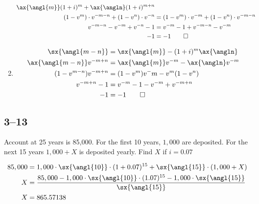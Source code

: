\documentclass[a4paper, 12pt, reqno]{amsart}
\numberwithin{equation}{section}
\begin{document}
\begin{enumerate}[label=(\alph*)]
\begin{equation}
\begin{aligned}
                    \ax{\angl{m}}(1+i)^m + \ax{\angln}(1+i)^{m+n}       \\
                (1 - v^m) \cdot v^{-m-n} + (1-v^n) \cdot v^{-n} &= 
                    (1-v^m) \cdot v^{-m} + (1-v^n) \cdot v^{-m-n}       \\
                v^{-m-n}-v^{-m}+v^{-n}-1 &= v^{-m} - 1 + v^{-m-n}-v^{-m}\\
                -1 &= -1    \qed
            \end{aligned}
        \end{equation}
    \item 
        \begin{equation}\nonumber
            \begin{aligned}
                \sx{\angl{m-n}} &= \sx{\angl{m}} - (1+i)^m\ax{\angln}   \\
                \ax{\angl{m-n}}v^{-m+n} &= \ax{\angl{m}}v^{-m}
                    - \ax{\angln}v^{-m}                                 \\
                (1-v^{m-n})v^{-m+n} &= (1-v^m)v^-m - v^m (1-v^n)        \\
                v^{-m+n} - 1 &= v^{-m} - 1 - v^{-m} + v^{-m+n}          \\
                -1 &= -1 \qed
            \end{aligned}
        \end{equation}
\end{enumerate}

\subsection*{3--13}

Account at 25 years is 85,000. For the first 10 years, $1,000$ are deposited. 
For the next 15 years $1,000 + X$ is deposited yearly. Find $X$ if $i=0.07$

\begin{equation}\nonumber
    \begin{aligned}
        85,000 &= 1,000 \cdot \sx{\angl{10}} \cdot (1+0.07)^{15} + 
            \sx{\angl{15}} \cdot (1,000 + X)                            \\
        X &= \frac{85,000 - 1,000\cdot\sx{\angl{10}}\cdot(1.07)^{15} 
            - 1,000 \cdot \sx{\angl{15}}}{\sx{\angl{15}}}               \\
        X &= 865.57138
    \end{aligned}
\end{equation}
\end{document}
